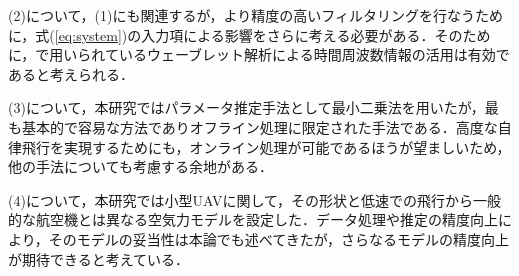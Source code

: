 (2)について，(1)にも関連するが，より精度の高いフィルタリングを行なうために，式(\ref{eq:system})の入力項による影響をさらに考える必要がある．そのために，\cite{narioka}で用いられているウェーブレット解析による時間周波数情報の活用は有効であると考えられる．

(3)について，本研究ではパラメータ推定手法として最小二乗法を用いたが，最も基本的で容易な方法でありオフライン処理に限定された手法である．高度な自律飛行を実現するためにも，オンライン処理が可能であるほうが望ましいため，他の手法についても考慮する余地がある．

(4)について，本研究では小型UAVに関して，その形状と低速での飛行から一般的な航空機とは異なる空気力モデルを設定した．データ処理や推定の精度向上により，そのモデルの妥当性は本論でも述べてきたが，さらなるモデルの精度向上が期待できると考えている．
